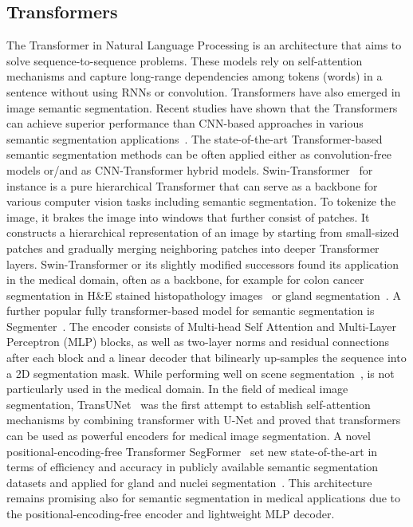 \subsection{Transformers}
The Transformer in  Natural Language Processing is an architecture that aims to solve
sequence-to-sequence problems.
These models rely on self-attention mechanisms and capture long-range dependencies among tokens
(words) in a sentence without using RNNs or convolution. Transformers have also emerged in image
semantic segmentation. Recent studies have shown that the Transformers can achieve superior performance
than CNN-based approaches in various semantic segmentation applications~\cite{nguyen2022evaluating}.
The state-of-the-art Transformer-based semantic segmentation methods can be often applied either as
convolution-free models or/and as CNN-Transformer hybrid models. Swin-Transformer~\cite{liu2021swin}
for instance is a pure hierarchical Transformer that can serve as a  backbone for various computer
vision tasks including semantic segmentation. To tokenize the image, it brakes the image into windows
that further consist of patches. It constructs a hierarchical representation of an image by starting
from small-sized patches and gradually merging neighboring patches into deeper Transformer layers.
Swin-Transformer or its slightly modified successors found its application in the medical domain,
often as a backbone, for example for colon cancer segmentation in H\&E stained histopathology
images~\cite{qian2022transformer} or gland segmentation~\cite{lin2022ds}. A further popular fully
transformer-based model for semantic segmentation is Segmenter~\cite{strudel2021segmenter}.
The encoder consists of Multi-head Self Attention and Multi-Layer Perceptron (MLP) blocks, as well
as two-layer norms and residual connections after each block and a linear decoder that bilinearly
up-samples the sequence into a 2D segmentation mask. While performing well on scene
segmentation~\cite{strudel2021segmenter}, is not particularly used in the medical domain.
In the field of medical image segmentation, TransUNet~\cite{chen2021transunet} was the first attempt
to establish self-attention mechanisms by combining transformer with U-Net and proved that
transformers can be used as powerful encoders for medical image segmentation.
A novel positional-encoding-free Transformer SegFormer~\cite{https://doi.org/10.48550/arxiv.2105.15203}
set new state-of-the-art in terms of efficiency and accuracy in publicly available semantic segmentation
datasets and applied for gland and nuclei segmentation~\cite{lin2022ds}.
This architecture remains promising also for semantic segmentation in medical
applications due to the positional-encoding-free encoder and lightweight MLP decoder.

